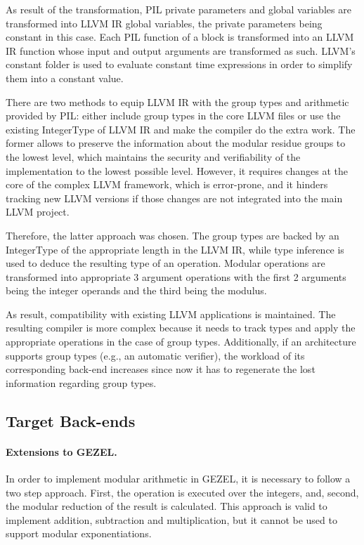 As result of the transformation, PIL private parameters and global
variables are transformed into LLVM IR global variables, the private
parameters being constant in this case. Each PIL function of a block
is transformed into an LLVM IR function whose input and output
arguments are transformed as such. LLVM's constant folder is used to
evaluate constant time expressions in order to simplify them into a
constant value.

There are two methods to equip LLVM IR with the group types and
arithmetic provided by PIL: either include group types in the core
LLVM files or use the existing IntegerType of LLVM IR and make the
compiler do the extra work. The former allows to preserve the
information about the modular residue groups to the lowest level,
which maintains the security and verifiability of the implementation
to the lowest possible level. However, it requires changes at the core
of the complex LLVM framework, which is error-prone, and it hinders
tracking new LLVM versions if those changes are not integrated into
the main LLVM project.

Therefore, the latter approach was chosen. The group types are backed
by an IntegerType of the appropriate length in the LLVM IR, while type
inference is used to deduce the resulting type of an
operation. Modular operations are transformed into appropriate 3
argument operations with the first 2 arguments being the integer
operands and the third being the modulus.

As result, compatibility with existing LLVM applications is
maintained. The resulting compiler is more complex because it needs to
track types and apply the appropriate operations in the case of group
types. Additionally, if an architecture supports group types (e.g., an
automatic verifier), the workload of its corresponding back-end
increases since now it has to regenerate the lost information
regarding group types.

\subsection{Target Back-ends}
\paragraph{Extensions to GEZEL.}
\label{extensionsGEZEL}

In order to implement modular arithmetic in GEZEL, it is necessary to
follow a two step approach. First, the operation is executed over the
integers, and, second, the modular reduction of the result is
calculated. This approach is valid to implement addition, subtraction
and multiplication, but it cannot be used to support modular
exponentiations.

